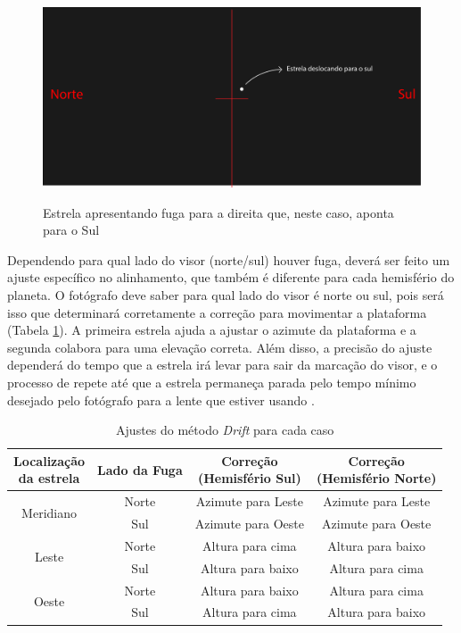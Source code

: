 \begin{figure}[hbt]
	\centering
	\caption{Estrela apresentando fuga para a direita que, neste caso, aponta para o Sul}
	\includegraphics[width=0.7\linewidth]{figuras/driftgrelha2}
	\label{fig:driftgrelha2}
\end{figure}

Dependendo para qual lado do visor (norte/sul) houver fuga, deverá ser feito um ajuste específico no alinhamento, que também é diferente para cada hemisfério do planeta. O fotógrafo deve saber para qual lado do visor é norte ou sul, pois será isso que determinará corretamente a correção para movimentar a plataforma (Tabela \ref{tab:drift}). A primeira estrela ajuda a ajustar o azimute da plataforma e a segunda colabora para uma elevação correta. Além disso, a precisão do ajuste dependerá do tempo que a estrela irá levar para sair da marcação do visor, e o processo de repete até que a estrela permaneça parada pelo tempo mínimo desejado pelo fotógrafo para a lente que estiver usando \cite{book:bbcsky}. 

\begin{table}[!htp]
	\centering
	\caption{Ajustes do método \textit{Drift} para cada caso}
	\label{tab:drift}		
		\begin{tabular}{c|c|c|c}
			\makecell{Localização\\da estrela} & Lado da Fuga & \makecell{Correção\\(Hemisfério Sul)}& \makecell{Correção\\(Hemisfério Norte)}\\  \hline
			\multirow{2}{*}{ Meridiano } & Norte & Azimute para Leste & Azimute para Leste \\ \cline{2-4}
			& Sul & Azimute para Oeste & Azimute para Oeste \\ \hline
			\multirow{2}{*}{ Leste } & Norte & Altura para cima & Altura para baixo \\ \cline{2-4}
			& Sul & Altura para baixo & Altura para cima \\ \hline
			\multirow{2}{*}{ Oeste } & Norte & Altura para baixo & Altura para cima \\ \cline{2-4}
			& Sul & Altura para cima & Altura para baixo \\ 
		\end{tabular}
	
\end{table}

